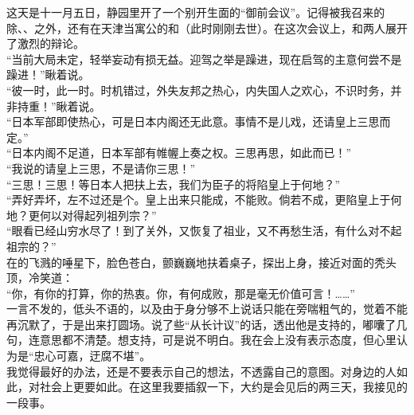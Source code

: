 这天是十一月五日，静园里开了一个别开生面的“御前会议”。记得被我召来的除、、之外，还有在天津当寓公的和（此时刚刚去世）。在这次会议上，和两人展开了激烈的辩论。\\

“当前大局未定，轻举妄动有损无益。迎驾之举是躁进，现在启驾的主意何尝不是躁进！”瞅着说。\\

“彼一时，此一时。时机错过，外失友邦之热心，内失国人之欢心，不识时务，并非持重！”瞅着说。\\

“日本军部即使热心，可是日本内阁还无此意。事情不是儿戏，还请皇上三思而定。”\\

“日本内阁不足道，日本军部有帷幄上奏之权。三思再思，如此而已！”\\

“我说的请皇上三思，不是请你三思！”\\

“三思！三思！等日本人把扶上去，我们为臣子的将陷皇上于何地？”\\

“弄好弄坏，左不过还是个。皇上出来只能成，不能败。倘若不成，更陷皇上于何地？更何以对得起列祖列宗？”\\

“眼看已经山穷水尽了！到了关外，又恢复了祖业，又不再愁生活，有什么对不起祖宗的？”\\

在的飞溅的唾星下，脸色苍白，颤巍巍地扶着桌子，探出上身，接近对面的秃头顶，冷笑道：\\

“你，有你的打算，你的热衷。你，有何成败，那是毫无价值可言！……”\\

一言不发的，低头不语的，以及由于身分够不上说话只能在旁喘粗气的，觉着不能再沉默了，于是出来打圆场。说了些“从长计议”的话，透出他是支持的，嘟囔了几句，连意思都不清楚。想支持，可是说不明白。我在会上没有表示态度，但心里认为是“忠心可嘉，迂腐不堪”。\\

我觉得最好的办法，还是不要表示自己的想法，不透露自己的意图。对身边的人如此，对社会上更要如此。在这里我要插叙一下，大约是会见后的两三天，我接见的一段事。\\

